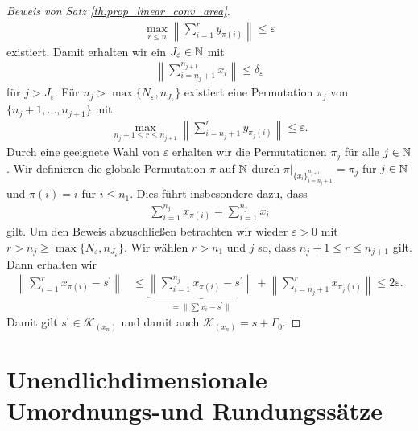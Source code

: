 \begin{proof}[Beweis von Satz \ref{th:prop_linear_conv_area}]
\begin{align*}
		\max \limits_{r \leq n} 
		\left\|
		\sum \limits_{i = 1}^r y_{\pi(i)}
		\right\|
		\leq 
		\varepsilon
	\end{align*}
	existiert. Damit erhalten wir ein $ J_\varepsilon \in \mathbb{N} $ mit
	\begin{align*}
		\left\|  \sum \limits_{i = n_j + 1}^{n_{j+1}} x_{i} 
		\right\| \leq \delta_\varepsilon
	\end{align*}
	für $ j > J_\varepsilon $.
	Für $ n_j > \max \{N_\varepsilon, n_{J_\varepsilon}\} $ existiert eine Permutation $ \pi_j $ von $ \{n_j+1,...,n_{j+1}\} $ mit
	\begin{align*}
		\max \limits_{n_j + 1 \leq r \leq n_{j+1}} 
		\left\|
		\sum \limits_{i = n_j + 1}^r y_{\pi_j(i)}
		\right\|
		\leq 
		\varepsilon.
	\end{align*} 
	Durch eine geeignete Wahl von $ \varepsilon $ erhalten wir die Permutationen $ \pi_j $ für alle $ j \in \mathbb{N} $.
	Wir definieren die globale Permutation $ \pi $ auf $ \mathbb{N} $ durch $ \pi\big|_{\{ x_i \}_{i = n_j + 1}^{n_{j+1}} } = \pi_j $ für $ j \in \mathbb{N} $ und $ \pi(i) = i $ für $ i \leq n_1 $.
	Dies führt insbesondere dazu, dass
	\begin{align*}
		\sum \limits_{i = 1}^{n_j} x_{\pi(i)}
		=
		\sum \limits_{i = 1}^{n_j} x_i
	\end{align*}
	gilt.
	Um den Beweis abzuschließen betrachten wir wieder $ \varepsilon > 0 $ mit $ r > n_j \geq \max \{N_\varepsilon, n_{J_\varepsilon}\}$. Wir wählen $ r > n_1  $ und $ j $ so, dass $ n_j + 1 \leq r \leq n_{j+1}  $ gilt.
	Dann erhalten wir
	\begin{align*}
		\left\|
		\sum \limits_{i=1}^r x_{\pi(i)} - s^\prime 
		\right\|
		&\leq
		\underbrace{\left\|
			\sum \limits_{i=1}^{n_j} x_{\pi(i)} - s^\prime 
			\right\| }_{
			= \| \sum x_i - s^\prime \|
		}
		+
		\left\|
		\sum \limits_{i = n_j +1}^{r}
		x_{\pi_j(i)}
		\right\| \leq 2 \varepsilon.
	\end{align*}
	Damit gilt $ s^\prime \in \mathcal{K}_{(x_n)} $ und damit auch $ \mathcal{K}_{(x_n)}  = s + \Gamma_0$.
\end{proof}

\section{Unendlichdimensionale Umordnungs-und Rundungssätze}

